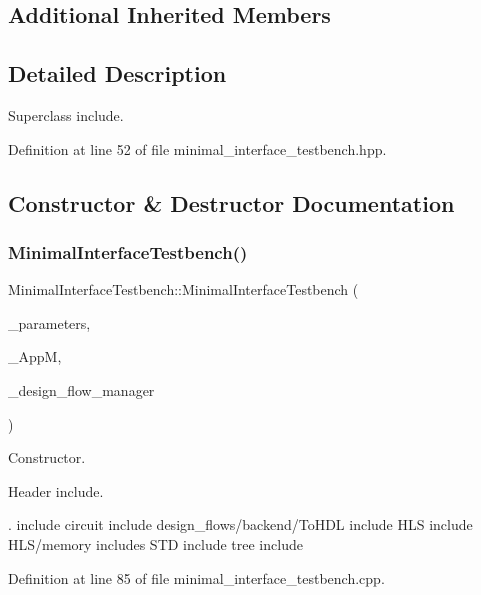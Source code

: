 \subsection*{Additional Inherited Members}


\subsection{Detailed Description}
Superclass include. 

Definition at line 52 of file minimal\+\_\+interface\+\_\+testbench.\+hpp.



\subsection{Constructor \& Destructor Documentation}
\mbox{\label{classMinimalInterfaceTestbench_a343f1d02af2a054ebd81ab80dcc55fb9}} 
\subsubsection{\texorpdfstring{Minimal\+Interface\+Testbench()}{MinimalInterfaceTestbench()}}
{\footnotesize\ttfamily Minimal\+Interface\+Testbench\+::\+Minimal\+Interface\+Testbench (\begin{DoxyParamCaption}\item[{const \hyperlink{Parameter_8hpp_a37841774a6fcb479b597fdf8955eb4ea}{Parameter\+Const\+Ref}}]{\+\_\+parameters,  }\item[{const \hyperlink{hls__manager_8hpp_acd3842b8589fe52c08fc0b2fcc813bfe}{H\+L\+S\+\_\+manager\+Ref}}]{\+\_\+\+AppM,  }\item[{const Design\+Flow\+Manager\+Const\+Ref}]{\+\_\+design\+\_\+flow\+\_\+manager }\end{DoxyParamCaption})}



Constructor. 

Header include.

. include circuit include design\+\_\+flows/backend/\+To\+H\+DL include H\+LS include H\+L\+S/memory includes S\+TD include tree include 

Definition at line 85 of file minimal\+\_\+interface\+\_\+testbench.\+cpp.



